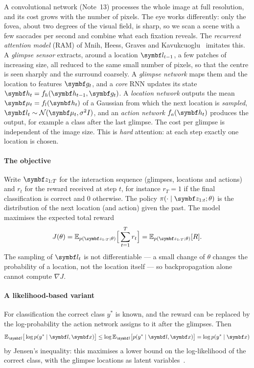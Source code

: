 \documentclass[11pt]{article}
\newcommand{\hv}{\vect{h}}
\begin{document}
A convolutional network (Note~13) processes the whole image at full resolution, and its cost grows with the number of
pixels. The eye works differently: only the fovea, about two degrees of the visual field, is sharp, so we scan a scene
with a few saccades per second and combine what each fixation reveals. The \emph{recurrent attention model} (RAM) of Mnih,
Heess, Graves and Kavukcuoglu~\cite{mnih2014} imitates this.
A \emph{glimpse sensor} extracts, around a location $\vect{l}_{t-1}$, a few patches of increasing size, all reduced to
the same small number of pixels, so that the centre is seen sharply and the surround coarsely. A \emph{glimpse network}
maps them and the location to features $\vect{g}_t$, and a \emph{core} RNN updates its state $\hv_t = f_h(\hv_{t-1},
\vect{g}_t)$. A \emph{location network} outputs the mean $\vect{\mu}_t = f_l(\hv_t)$ of a Gaussian from which the next
location is \emph{sampled}, $\vect{l}_t \sim \Normal(\vect{\mu}_t, \sigma^2 I)$, and an \emph{action network} $f_a(\hv_t)$
produces the output, for example a class after the last glimpse.
The cost per glimpse is independent of the image size. This is \emph{hard} attention: at each step exactly one location is
chosen.

\paragraph{The objective} Write $\vect{z}_{1:T}$ for the interaction sequence (glimpses, locations and actions) and
$r_t$ for the reward received at step $t$, for instance $r_T = 1$ if the final classification is correct and $0$ otherwise.
The policy $\pi(\cdot \mid \vect{z}_{1:t}; \theta)$ is the distribution of the next location (and action) given the past. The
model maximises the expected total reward
\begin{equation}\label{eq:ramobj}
  J(\theta) = \E_{p(\vect{z}_{1:T}; \theta)}\Big[\sum_{t=1}^{T} r_t\Big] = \E_{p(\vect{z}_{1:T}; \theta)}[R] .
\end{equation}
The sampling of $\vect{l}_t$ is not differentiable --- a small change of $\theta$ changes the probability of a location, not
the location itself --- so backpropagation alone cannot compute $\nabla J$.

\paragraph{A likelihood-based variant} For classification the correct class $y^*$ is known, and the reward can be replaced
by the log-probability the action network assigns to it after the glimpses. Then
\[
  \E_{\vect{l}}\big[\log p(y^* \mid \vect{l}, \x)\big] \le \log \E_{\vect{l}}\big[p(y^* \mid \vect{l}, \x)\big] = \log p(y^* \mid \x)
\]
by Jensen's inequality: this maximises a lower bound on the log-likelihood of the correct class, with the glimpse
locations as latent variables~\cite{ba2015}.
\end{document}
